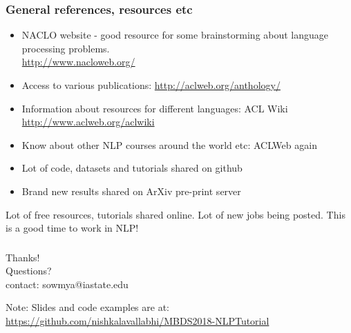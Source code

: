\documentclass{beamer}
\begin{document}
\begin{frame}
\frametitle{General references, resources etc}
\begin{itemize}
\item NACLO website - good resource for some brainstorming about language processing problems. \\ \url{http://www.nacloweb.org/}
\item Access to various publications: \url{http://aclweb.org/anthology/} \\ 
\item Information about resources for different languages: ACL Wiki \url{http://www.aclweb.org/aclwiki}
\item Know about other NLP courses around the world etc: ACLWeb again
\item Lot of code, datasets and tutorials shared on github
\item Brand new results shared on ArXiv pre-print server
\end{itemize}
\pause Lot of free resources, tutorials shared online. Lot of new jobs being posted. This is a good time to work in NLP!
\end{frame}

\begin{frame}
\frametitle{}
\centering
Thanks! 
\\ Questions? \\ \bigskip
contact: sowmya@iastate.edu \\ \bigskip

Note: Slides and code examples are at: \footnotesize \url{https://github.com/nishkalavallabhi/MBDS2018-NLPTutorial}
\end{frame}
\end{document}

